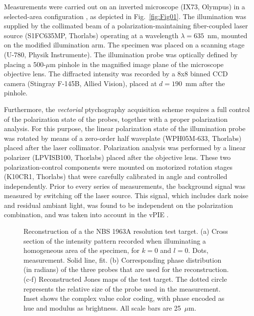 \documentclass[aps,prl,twocolumn,amsmath]{revtex4-1}
\begin{document}
Measurements were carried out on an inverted microscope (IX73, Olympus) in a selected-area configuration \cite{maiden_SPIE_2010}, as depicted in Fig.~\ref{fig:Fig01}. The illumination was supplied by the collimated beam of a polarization-maintaining fiber-coupled laser source (S1FC635MP, Thorlabs) operating at a wavelength $\lambda = 635$~nm, mounted on the modified illumination arm. The specimen was placed on a scanning stage (U-780, Physik Instrumente). The illumination probe was optically defined by placing a 500-$\mu$m pinhole in the magnified image plane of the microscope objective lens. The diffracted intensity was recorded by a 8x8 binned CCD camera (Stingray F-145B, Allied Vision), placed at $d = 190$~mm after the pinhole.

Furthermore, the \emph{vectorial} ptychography acquisition scheme requires a full control of the polarization state of the probes, together with a proper polarization analysis. For this purpose, the linear polarization state of the illumination probe was rotated by means of a zero-order half waveplate (WPH05M-633, Thorlabs) placed after the laser collimator. Polarization analysis was performed by a linear polarizer (LPVISB100, Thorlabs) placed after the objective lens. These two polarization-control components were mounted on motorized rotation stages (K10CR1, Thorlabs) that were carefully calibrated in angle and controlled independently. Prior to every series of measurements, the background signal was measured by switching off the laser source. This signal, which includes dark noise and residual ambiant light, was found to be independent on the polarization combination, and was taken into account in the vPIE \cite{Ferrand15}.

\begin{figure}[!h]
\centering
{}
\caption{Reconstruction of a the NBS 1963A resolution test target. (a) Cross section of the intensity pattern recorded when illuminating a homogeneous area of the specimen, for $k=0$ and $l=0$. Dots, measurement. Solid line, fit. (b) Corresponding phase distribution (in radians) of the three probes that are used for the reconstruction. (c-f) Reconstructed Jones maps of the test target. The dotted circle represents the relative size of the probe used in the measurement. Inset shows the complex value color coding, with phase encoded as hue and modulus as brightness. All scale bars are 25~$\mu$m.}
\label{fig:Fig02}
\end{figure}
\end{document}
